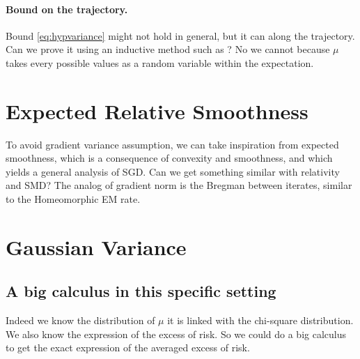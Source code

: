 \documentclass{article}
\begin{document}
\paragraph{Bound on the trajectory.}
Bound \eqref{eq:hypvariance} might not hold in general, but it can along the trajectory. Can we prove it using an inductive method such as \citet[Appendix A]{lacoste2012simpler}?
No we cannot because $\mu$ takes every possible values as a random variable within the expectation.

\section{Expected Relative Smoothness}
To avoid gradient variance assumption, we can take inspiration from expected smoothness, which is a consequence of convexity and smoothness, and which yields a general analysis of SGD. Can we get something similar with relativity and SMD? 
The analog of gradient norm is the Bregman between iterates, similar to the Homeomorphic EM rate. 




\section{Gaussian Variance}
\subsection{A big calculus in this specific setting}

Indeed we know the distribution of $\mu$ it is linked with the chi-square distribution. We also know the expression of the excess of risk. So we could do a big calculus to get the exact expression of the averaged excess of risk.
\end{document}
